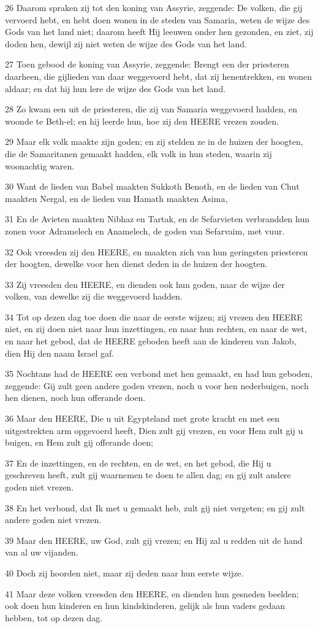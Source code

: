 \par 26 Daarom spraken zij tot den koning van Assyrie, zeggende: De volken, die gij vervoerd hebt, en hebt doen wonen in de steden van Samaria, weten de wijze des Gods van het land niet; daarom heeft Hij leeuwen onder hen gezonden, en ziet, zij doden hen, dewijl zij niet weten de wijze des Gods van het land.
\par 27 Toen gebood de koning van Assyrie, zeggende: Brengt een der priesteren daarheen, die gijlieden van daar weggevoerd hebt, dat zij henentrekken, en wonen aldaar; en dat hij hun lere de wijze des Gods van het land.
\par 28 Zo kwam een uit de priesteren, die zij van Samaria weggevoerd hadden, en woonde te Beth-el; en hij leerde hun, hoe zij den HEERE vrezen zouden.
\par 29 Maar elk volk maakte zijn goden; en zij stelden ze in de huizen der hoogten, die de Samaritanen gemaakt hadden, elk volk in hun steden, waarin zij woonachtig waren.
\par 30 Want de lieden van Babel maakten Sukkoth Benoth, en de lieden van Chut maakten Nergal, en de lieden van Hamath maakten Asima,
\par 31 En de Avieten maakten Nibhaz en Tartak, en de Sefarvieten verbrandden hun zonen voor Adramelech en Anamelech, de goden van Sefarvaim, met vuur.
\par 32 Ook vreesden zij den HEERE, en maakten zich van hun geringsten priesteren der hoogten, dewelke voor hen dienst deden in de huizen der hoogten.
\par 33 Zij vreesden den HEERE, en dienden ook hun goden, naar de wijze der volken, van dewelke zij die weggevoerd hadden.
\par 34 Tot op dezen dag toe doen die naar de eerste wijzen; zij vrezen den HEERE niet, en zij doen niet naar hun inzettingen, en naar hun rechten, en naar de wet, en naar het gebod, dat de HEERE geboden heeft aan de kinderen van Jakob, dien Hij den naam Israel gaf.
\par 35 Nochtans had de HEERE een verbond met hen gemaakt, en had hun geboden, zeggende: Gij zult geen andere goden vrezen, noch u voor hen nederbuigen, noch hen dienen, noch hun offerande doen.
\par 36 Maar den HEERE, Die u uit Egypteland met grote kracht en met een uitgestrekten arm opgevoerd heeft, Dien zult gij vrezen, en voor Hem zult gij u buigen, en Hem zult gij offerande doen;
\par 37 En de inzettingen, en de rechten, en de wet, en het gebod, die Hij u geschreven heeft, zult gij waarnemen te doen te allen dag; en gij zult andere goden niet vrezen.
\par 38 En het verbond, dat Ik met u gemaakt heb, zult gij niet vergeten; en gij zult andere goden niet vrezen.
\par 39 Maar den HEERE, uw God, zult gij vrezen; en Hij zal u redden uit de hand van al uw vijanden.
\par 40 Doch zij hoorden niet, maar zij deden naar hun eerste wijze.
\par 41 Maar deze volken vreesden den HEERE, en dienden hun gesneden beelden; ook doen hun kinderen en hun kindskinderen, gelijk als hun vaders gedaan hebben, tot op dezen dag.

